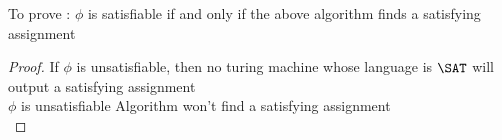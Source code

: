 To prove : $\phi$ is satisfiable if and only if the above algorithm finds a satisfying assignment
\begin{proof}
    If $\phi$ is unsatisfiable, then no turing machine whose language is $\SAT$ will output a satisfying assignment\\
    \imp
    $\phi$ is unsatisfiable \imp Algorithm won't find a satisfying assignment\\

    
\end{proof}




